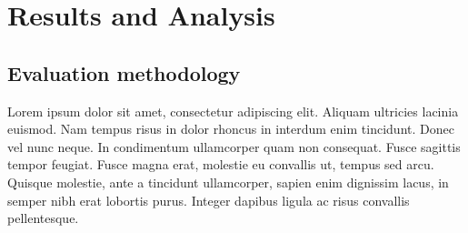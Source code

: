 \section{Results and Analysis}

\subsection{Evaluation methodology}
Lorem ipsum dolor sit amet, consectetur adipiscing elit. Aliquam ultricies lacinia euismod. Nam tempus risus in dolor rhoncus in interdum enim tincidunt. Donec vel nunc neque. In condimentum ullamcorper quam non consequat. Fusce sagittis tempor feugiat. Fusce magna erat, molestie eu convallis ut, tempus sed arcu. Quisque molestie, ante a tincidunt ullamcorper, sapien enim dignissim lacus, in semper nibh erat lobortis purus. Integer dapibus ligula ac risus convallis pellentesque.


